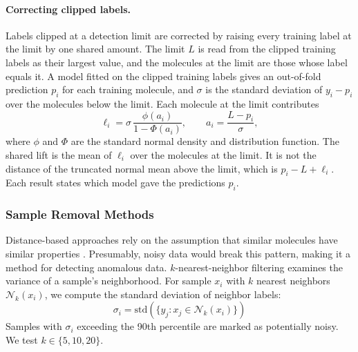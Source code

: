 \paragraph{Correcting clipped labels.}\label{sec:similarity:censoring_lift}
Labels clipped at a detection limit are corrected by raising every training label at the limit by one shared amount. The limit $L$ is read from the clipped training labels as their largest value, and the molecules at the limit are those whose label equals it. A model fitted on the clipped training labels gives an out-of-fold prediction $p_i$ for each training molecule, and $\sigma$ is the standard deviation of $y_i - p_i$ over the molecules below the limit. Each molecule at the limit contributes
\begin{equation}
\ell_i = \sigma\,\frac{\phi(a_i)}{1 - \Phi(a_i)}, \qquad a_i = \frac{L - p_i}{\sigma},
\end{equation}
where $\phi$ and $\Phi$ are the standard normal density and distribution function. The shared lift is the mean of $\ell_i$ over the molecules at the limit. It is not the distance of the truncated normal mean above the limit, which is $p_i - L + \ell_i$. Each result states which model gave the predictions $p_i$.

\subsubsection{Sample Removal Methods}

Distance-based approaches rely on the assumption that similar molecules have similar properties \citep{Cherkasov2014}. Presumably, noisy data would break this pattern, making it a method for detecting anomalous data. $k$-nearest-neighbor filtering examines the variance of a sample's neighborhood. For sample $x_i$ with $k$ nearest neighbors $\mathcal{N}_k(x_i)$, we compute the standard deviation of neighbor labels:
\begin{equation}
\sigma_i = \text{std}(\{y_j : x_j \in \mathcal{N}_k(x_i)\})
\end{equation}
Samples with $\sigma_i$ exceeding the 90th percentile are marked as potentially noisy. We test $k \in \{5, 10, 20\}$.


